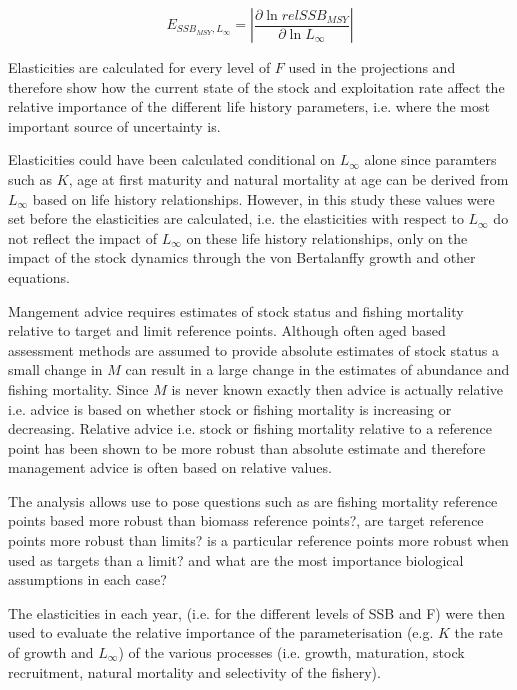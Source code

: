 \documentclass{pnastwo}
\begin{document}
\begin{article}
\begin{materials}
\begin{equation}
E_{SSB_{MSY},L_{\infty}} = \left| \frac{\partial \ln relSSB_{MSY}}{\partial \ln L_{\infty}} \right|
\end{equation}

Elasticities are calculated for every level of $F$ used in the projections and therefore show how the current state of the stock and exploitation rate
affect the relative importance of the different life history parameters, i.e. where the most important source of uncertainty is.

Elasticities could have been calculated conditional on $L_{\infty}$ alone since paramters such as $K$, age at first maturity
and natural mortality at age can be derived from $L_{\infty}$ based on life history relationships. However, in this study these values 
were set before the elasticities are calculated, i.e. the elasticities  with respect to $L_{\infty}$ do not reflect the impact 
of $L_{\infty}$ on these life history relationships, only on the impact of the stock dynamics  through the von Bertalanffy growth and other equations.  

Mangement advice requires estimates of stock status and fishing mortality relative to target and limit reference points.
Although often aged based assessment methods are assumed to provide absolute
estimates of stock status a small change in $M$ can result in a large change in the
estimates of abundance and fishing mortality. Since $M$ is never known exactly then
advice is actually relative i.e. advice is based on whether stock or fishing mortality
is increasing or decreasing. Relative advice i.e. stock or
fishing mortality relative to a reference point has been shown to be more robust than absolute estimate \cite{kell2003evaluation}
and therefore management advice is often based on relative values.

The analysis allows use to pose questions such as are fishing mortality reference points based more robust than biomass
reference points?, are target reference points more robust than limits? is a particular reference points more robust when used as targets than a limit?
and what are the most importance biological assumptions in each case?

The elasticities in each year, (i.e. for the different levels of SSB and F) were then used to
evaluate the relative importance of the parameterisation (e.g. $K$ the rate of growth and $L_{\infty}$) 
of the various processes (i.e. growth, maturation, stock recruitment, 
natural mortality and selectivity of the fishery). 


\end{materials}
\end{article}
\end{document}
